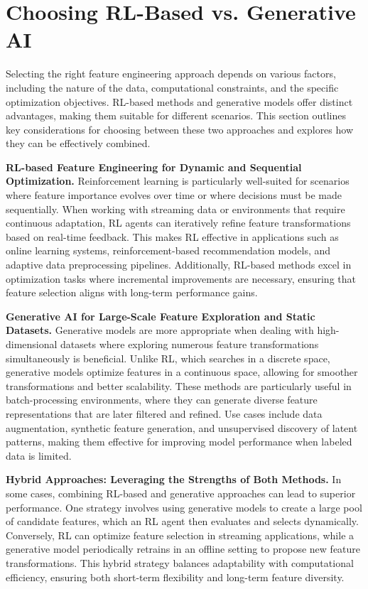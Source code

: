 \section{Choosing RL-Based vs. Generative AI}
Selecting the right feature engineering approach depends on various factors, including the nature of the data, computational constraints, and the specific optimization objectives. RL-based methods and generative models offer distinct advantages, making them suitable for different scenarios. This section outlines key considerations for choosing between these two approaches and explores how they can be effectively combined.

\noindent
\textbf{RL-based Feature Engineering for Dynamic and Sequential Optimization.}
Reinforcement learning is particularly well-suited for scenarios where feature importance evolves over time or where decisions must be made sequentially. When working with streaming data or environments that require continuous adaptation, RL agents can iteratively refine feature transformations based on real-time feedback. This makes RL effective in applications such as online learning systems, reinforcement-based recommendation models, and adaptive data preprocessing pipelines. Additionally, RL-based methods excel in optimization tasks where incremental improvements are necessary, ensuring that feature selection aligns with long-term performance gains.

\noindent
\textbf{Generative AI for Large-Scale Feature Exploration and Static Datasets.}
Generative models are more appropriate when dealing with high-dimensional datasets where exploring numerous feature transformations simultaneously is beneficial. Unlike RL, which searches in a discrete space, generative models optimize features in a continuous space, allowing for smoother transformations and better scalability. These methods are particularly useful in batch-processing environments, where they can generate diverse feature representations that are later filtered and refined. Use cases include data augmentation, synthetic feature generation, and unsupervised discovery of latent patterns, making them effective for improving model performance when labeled data is limited.

\noindent
\textbf{Hybrid Approaches: Leveraging the Strengths of Both Methods.}
In some cases, combining RL-based and generative approaches can lead to superior performance. One strategy involves using generative models to create a large pool of candidate features, which an RL agent then evaluates and selects dynamically. Conversely, RL can optimize feature selection in streaming applications, while a generative model periodically retrains in an offline setting to propose new feature transformations. This hybrid strategy balances adaptability with computational efficiency, ensuring both short-term flexibility and long-term feature diversity.

